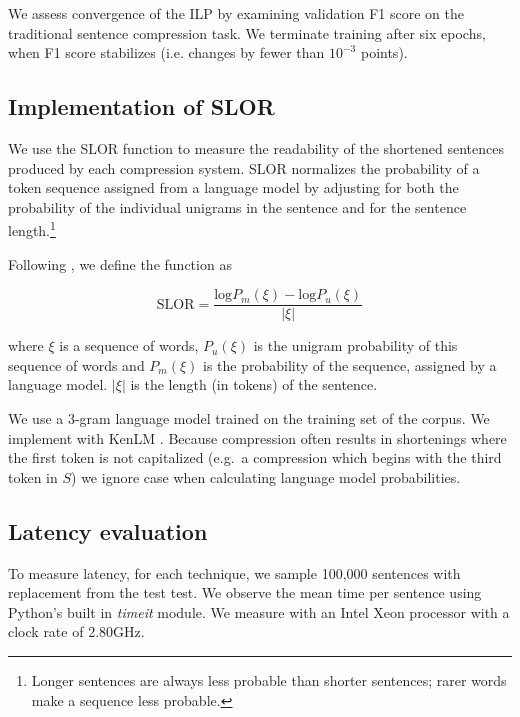 We assess convergence of the ILP by examining validation F1 score on the traditional sentence compression task. We terminate training after six epochs, when F1 score stabilizes (i.e. changes by fewer than $10^{-3}$ points).

\subsection{Implementation of SLOR}

We use the SLOR function to measure the readability of the shortened sentences produced by each compression system. SLOR normalizes the probability of a token sequence assigned from a language model by adjusting for both the probability of the individual unigrams in the sentence and for the sentence length.\footnote{Longer sentences are always less probable than shorter sentences; rarer words make a sequence less probable.} 

Following \cite{lau2015unsupervised}, we define the function as 

\begin{equation}
\text{SLOR}=\frac{\text{log}P_m(\xi) - \text{log}P_u(\xi)}{|\xi|}
\end{equation}

where $\xi$ is a sequence of words, $P_u(\xi)$ is the unigram probability of this sequence of words and $P_m(\xi)$ is the probability of the sequence, assigned by a language model.  $|\xi|$ is the length (in tokens) of the sentence.

We use a 3-gram language model trained on the training set of the \citet{filippova2013overcoming} corpus. We implement with KenLM \cite{Heafield-kenlm}. Because compression often results in shortenings where the first token is not capitalized (e.g.\ a compression which begins with the third token in $S$) we ignore case when calculating language model probabilities.

\subsection{Latency evaluation}
To measure latency, for each technique, we sample 100,000 sentences with replacement from the test test. We observe the mean time per sentence using Python's built in \textit{timeit} module. We measure with an Intel Xeon processor with a clock rate of 2.80GHz. 

